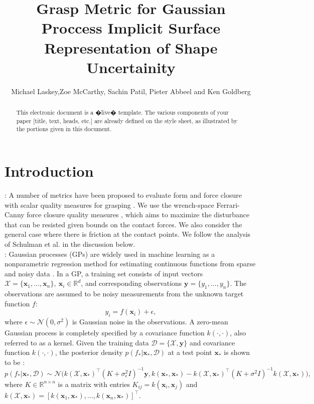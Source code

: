 \documentclass[letterpaper, 10 pt, conference]{ieeeconf}  %
\title{\LARGE \bf
Grasp Metric for Gaussian Proccess Implicit Surface Representation of Shape Uncertainity }
\author{Michael Laskey,Zoe McCarthy, Sachin Patil, Pieter Abbeel and Ken Goldberg}%
\newcommand{\by}{\mathbf{y}}
\newcommand{\bx}{\mathbf{x}}
\newcommand{\mX}{\mathcal{X}}
\newcommand{\mD}{\mathcal{D}}
\newcommand{\mN}{\mathcal{N}}
\begin{document}
\maketitle
\thispagestyle{empty}
\pagestyle{empty}


\begin{abstract}

This electronic document is a �live� template. The various components of your paper [title, text, heads, etc.] are already defined on the style sheet, as illustrated by the portions given in this document.

\end{abstract}


\section{Introduction}

\vspace{10pt}
: A number of metrics have been proposed to evaluate form and force closure with scalar quality measures for grasping \cite{bicchi2000}. We use the wrench-space Ferrari-Canny force closure quality measures \cite{ferrari1992}, which aims to maximize the disturbance that can be resisted given bounds on the contact forces. We also consider the general case where there is friction at the contact points. We follow the analysis of Schulman et al. \cite{schulman2011} in the discussion below.\\


: Gaussian processes (GPs) are widely used in machine learning as a nonparametric regression method for estimating continuous functions from sparse and noisy data \cite{rasmussen2006}. In a GP, a training set consists of input vectors $\mX = \{\bx_1, \ldots, \bx_n\}, ~\bx_i \in \mathbb{R}^d$, and corresponding observations $\by = \{y_1, \ldots, y_n\}$. The observations are assumed to be noisy measurements from the unknown target function $f$:
\begin{equation}
y_i = f(\bx_i) + \epsilon,
\end{equation}
where $\epsilon \sim \mN(0,\sigma^2)$ is Gaussian noise in the observations. A zero-mean Gaussian process is completely specified by a covariance function $k(\cdot,\cdot)$, also referred to as a kernel. Given the training data $\mD = \{\mX, \by\}$ and covariance function $k(\cdot,\cdot)$, the posterior density $p(f_*|\bx_*,\mD)$ at a test point $\bx_{*}$ is shown to be \cite{rasmussen2006}:
\begin{equation}
p(f_*|\bx_*,\mD) \sim \mN\big(k(\mX,\bx_*)^{\intercal}(K + \sigma_{\epsilon}^2I)^{-1}\by, k(\bx_*,\bx_*)-k(\mX,\bx_*)^{\intercal}(K+\sigma^2I)^{-1}k(\mX,\bx_*)\big), \label{eq:GPposterior}
\end{equation}
where $K \in \mathbb{R}^{n \times n}$ is a matrix with entries $K_{ij} = k(\bx_i,\bx_j)$ and $k(\mX,\bx_*) = [k(\bx_1,\bx_*),\ldots,k(\bx_n,\bx_*)]^{\intercal}$. 
\end{document}
